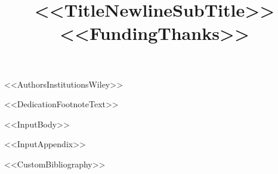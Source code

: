 \documentclass[%
ACS,
STIX1COL,
<<DocumentClassOptions>>]{WileyNJD-v2-zamm}
\begin{document}
\title{<<TitleNewlineSubTitle>>\protect<<FundingThanks>>}

<<AuthorsInstitutionsWiley>>





\maketitle

<<DedicationFootnoteText>>

<<InputBody>>

\appendix
<<InputAppendix>>

<<CustomBibliography>>
\end{document}
